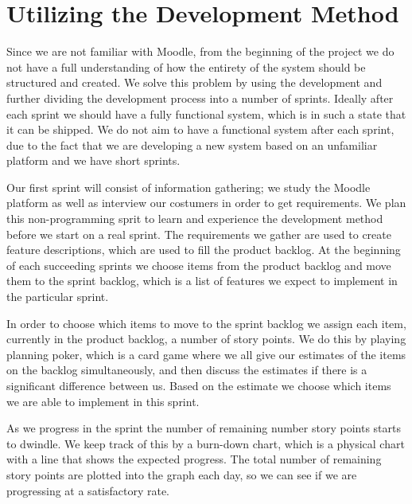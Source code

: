 \section{Utilizing the Development Method} %
Since we are not familiar with Moodle, from the beginning of the project we do not have a full understanding of how the entirety of the system should be structured and created.
We solve this problem by using the development \scrum{} and further dividing the development process into a number of sprints.
Ideally after each sprint we should have a fully functional system, which is in such a state that it can be shipped.
We do not aim to have a functional system after each sprint, due to the fact that we are developing a new system based on an unfamiliar platform and we have short sprints. 


Our first sprint will consist of information gathering; we study the Moodle platform as well as interview our costumers in order to get requirements. 
We plan this non-programming sprit to learn and experience the \scrum{} development method before we start on a real sprint.
The requirements we gather are used to create feature descriptions, which are used to fill the product backlog.
At the beginning of each succeeding sprints we choose items from the product backlog and move them to the sprint backlog, which is a list of features we expect to implement in the particular sprint.

In order to choose which items to move to the sprint backlog we assign each item, currently in the product backlog, a number of story points.
We do this by playing planning poker, which is a card game where we all give our estimates of the items on the backlog simultaneously, and then discuss the estimates if there is a significant difference between us.
Based on the estimate we choose which items we are able to implement in this sprint.

As we progress in the sprint the number of remaining number story points starts to dwindle. 
We keep track of this by a burn-down chart, which is a physical chart with a line that shows the expected progress.
The total number of remaining story points are plotted into the graph each day, so we can see if we are progressing at a satisfactory rate.

